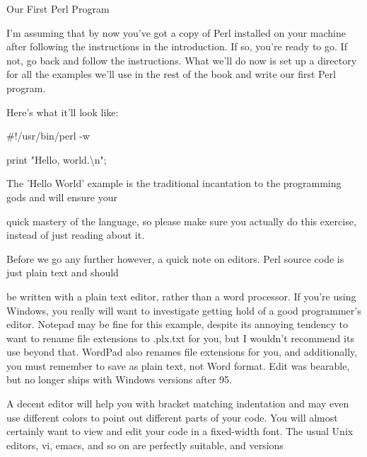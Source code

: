 \documentclass[a4paper,11pt]{book}
\begin{document}
\noindent 

\noindent 

\noindent Our First Perl Program

\noindent 

\noindent I'm assuming that by now you've got a copy of Perl installed on your machine after following the instructions in the introduction. If so, you're ready to go. If not, go back and follow the instructions. What we'll do now is set up a directory for all the examples we'll use in the rest of the book and write our first Perl program.

\noindent 

\noindent Here's what it'll look like:

\noindent 

\noindent \#!/usr/bin/perl -w

\noindent 

\noindent print "Hello, world.\textbackslash n";

\noindent 

\noindent 

\noindent The 'Hello World' example is the traditional incantation to the programming gods and will ensure your

\noindent quick mastery of the language, so please make sure you actually do this exercise, instead of just reading about it.

\noindent 

\noindent Before we go any further however, a quick note on editors. Perl source code is just plain text and should

\noindent be written with a plain text editor, rather than a word processor. If you're using Windows, you really will want to investigate getting hold of a good programmer's editor. Notepad may be fine for this example, despite its annoying tendency to want to rename file extensions to .plx.txt for you, but I wouldn't recommend its use beyond that. WordPad also renames file extensions for you, and additionally, you must remember to save as plain text, not Word format. Edit was bearable, but no longer ships with Windows versions after 95.

\noindent 

\noindent A decent editor will help you with bracket matching indentation and may even use different colors to point out different parts of your code. You will almost certainly want to view and edit your code in a fixed-width font. The usual Unix editors, vi, emacs, and so on are perfectly suitable, and versions
\end{document}
